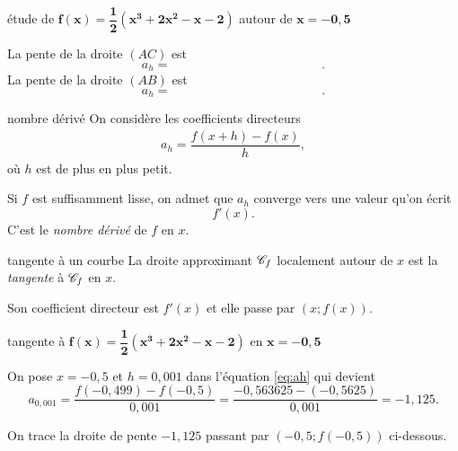 \begin{exemple*}{étude de $\mathbf{f(x) = \dfrac12(x^3 + 2x^2 - x - 2)}$ autour de $\mathbf{x=-0,5}$}{}
\begin{center}
\end{center}

La pente de la droite $(AC)$ est
	\[ a_h = \qquad\qquad\qquad\qquad\qquad\qquad. \]
La pente de la droite $(AB)$ est
	\[ a_h = \qquad\qquad\qquad\qquad\qquad\qquad. \]

\end{exemple*}


\begin{definition*}{nombre dérivé}{}
	On considère les coefficients directeurs
		\begin{align}
			a_h = \dfrac{f(x+h) - f(x)}h, \label{eq:ah}
		\end{align}
	où $h$ est de plus en plus petit.

	Si $f$ est suffisamment lisse, on admet que $a_h$ converge vers une valeur qu'on écrit
		\[ f'(x). \]
	C'est le \emph{nombre dérivé} de $f$ en $x$.
\end{definition*}

\begin{definition*}{tangente à un courbe}{}
	La droite approximant $\mathcal{C}_f$ localement autour de $x$ est la \emph{tangente} à $\mathcal{C}_f$ en $x$.
	
	Son coefficient directeur est $f'(x)$ et elle passe par $(x; f(x))$.
	
\end{definition*}

\begin{exemple*}{tangente à $\mathbf{f(x) = \dfrac12(x^3 + 2x^2 - x - 2)}$ en $\mathbf{x=-0,5}$}{}

On pose $x=-0,5$ et $h=0,001$ dans l'équation \eqref{eq:ah} qui devient
	\[ a_{0,001} = \dfrac{f(-0,499) - f(-0,5)}{0,001} = \dfrac{-0,563625 - (-0,5625)}{0,001} = -1,125. \]
	
On trace la droite de pente $-1,125$ passant par $(-0,5 ; f(-0,5))$ ci-dessous.

\begin{center}
\end{center}

\end{exemple*}

